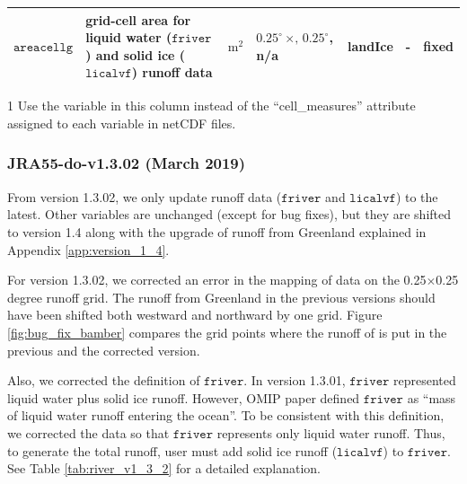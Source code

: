 \documentclass[dvipdfmx]{elsarticle_mod}
\begin{document}
\begin{table}[h]
\begin{threeparttable}
\begin{tabular*}{17.5cm}{p{1.6cm}|p{3.3cm}|p{1.4cm}|p{2.5cm}|p{1.4cm}|p{1.5cm}|p{2.8cm}}
$\texttt{areacellg}$ & grid-cell area for liquid water ($\mathtt{friver}$) and solid ice ($\mathtt{licalvf}$) runoff data & $\mathrm{m}^{2}$ & $0.25^{\circ} \, \times, \, 0.25^{\circ}$, n/a & landIce & - & fixed \\ \hline
\end{tabular*}
\begin{tablenotes}
 \item[1]{Use the variable in this column instead of the ``cell\_measures'' attribute assigned to each variable in netCDF files.}
\end{tablenotes}
\end{threeparttable}
\end{table}


\subsubsection{JRA55-do-v1.3.02 (March 2019)}
\label{app:version_1_3_2}

From version 1.3.02, we only update runoff data ($\mathtt{friver}$ and $\mathtt{licalvf}$) to the latest. Other variables are unchanged (except for bug fixes), but they are shifted to version 1.4 along with the upgrade of runoff from Greenland explained in Appendix \ref{app:version_1_4}.

For version 1.3.02, we corrected an error in the mapping of \citet{Bamber_et_al_2012} data on the 0.25$\times$0.25 degree runoff grid. The runoff from Greenland in the previous versions should have been shifted both westward and northward by one grid. Figure \ref{fig:bug_fix_bamber} compares the grid points where the runoff of \citet{Bamber_et_al_2012} is put in the previous and the corrected version.

Also, we corrected the definition of $\mathtt{friver}$. In version 1.3.01, $\mathtt{friver}$ represented liquid water plus solid ice runoff. However, OMIP paper \citep{Griffies_et_al_2016} defined ${\mathtt{friver}}$ as ``mass of liquid water runoff entering the ocean''. To be consistent with this definition, we corrected the data so that $\mathtt{friver}$ represents only liquid water runoff. Thus, to generate the total runoff, user must add solid ice runoff ($\mathtt{licalvf}$) to $\mathtt{friver}$. See Table \ref{tab:river_v1_3_2} for a detailed explanation.
\end{document}
